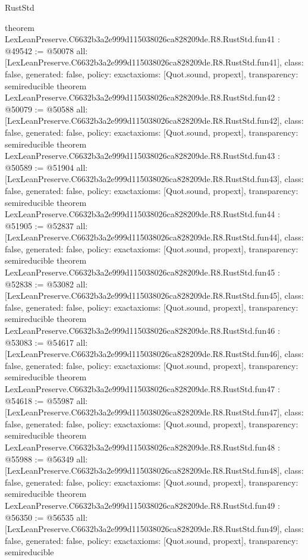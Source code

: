 \begin{lexlean}{RustStd}
\begin{coremodule}
{}
theorem LexLeanPreserve.C6632b3a2e999d115038026ca828209de.R8.RustStd.fun41 : @49542 := @50078 {
  all: [LexLeanPreserve.C6632b3a2e999d115038026ca828209de.R8.RustStd.fun41],
  class: false,
  generated: false,
  policy: exact{axioms: [Quot.sound, propext]},
  transparency: semireducible
}
theorem LexLeanPreserve.C6632b3a2e999d115038026ca828209de.R8.RustStd.fun42 : @50079 := @50588 {
  all: [LexLeanPreserve.C6632b3a2e999d115038026ca828209de.R8.RustStd.fun42],
  class: false,
  generated: false,
  policy: exact{axioms: [Quot.sound, propext]},
  transparency: semireducible
}
theorem LexLeanPreserve.C6632b3a2e999d115038026ca828209de.R8.RustStd.fun43 : @50589 := @51904 {
  all: [LexLeanPreserve.C6632b3a2e999d115038026ca828209de.R8.RustStd.fun43],
  class: false,
  generated: false,
  policy: exact{axioms: [Quot.sound, propext]},
  transparency: semireducible
}
theorem LexLeanPreserve.C6632b3a2e999d115038026ca828209de.R8.RustStd.fun44 : @51905 := @52837 {
  all: [LexLeanPreserve.C6632b3a2e999d115038026ca828209de.R8.RustStd.fun44],
  class: false,
  generated: false,
  policy: exact{axioms: [Quot.sound, propext]},
  transparency: semireducible
}
theorem LexLeanPreserve.C6632b3a2e999d115038026ca828209de.R8.RustStd.fun45 : @52838 := @53082 {
  all: [LexLeanPreserve.C6632b3a2e999d115038026ca828209de.R8.RustStd.fun45],
  class: false,
  generated: false,
  policy: exact{axioms: [Quot.sound, propext]},
  transparency: semireducible
}
theorem LexLeanPreserve.C6632b3a2e999d115038026ca828209de.R8.RustStd.fun46 : @53083 := @54617 {
  all: [LexLeanPreserve.C6632b3a2e999d115038026ca828209de.R8.RustStd.fun46],
  class: false,
  generated: false,
  policy: exact{axioms: [Quot.sound, propext]},
  transparency: semireducible
}
theorem LexLeanPreserve.C6632b3a2e999d115038026ca828209de.R8.RustStd.fun47 : @54618 := @55987 {
  all: [LexLeanPreserve.C6632b3a2e999d115038026ca828209de.R8.RustStd.fun47],
  class: false,
  generated: false,
  policy: exact{axioms: [Quot.sound, propext]},
  transparency: semireducible
}
theorem LexLeanPreserve.C6632b3a2e999d115038026ca828209de.R8.RustStd.fun48 : @55988 := @56349 {
  all: [LexLeanPreserve.C6632b3a2e999d115038026ca828209de.R8.RustStd.fun48],
  class: false,
  generated: false,
  policy: exact{axioms: [Quot.sound, propext]},
  transparency: semireducible
}
theorem LexLeanPreserve.C6632b3a2e999d115038026ca828209de.R8.RustStd.fun49 : @56350 := @56535 {
  all: [LexLeanPreserve.C6632b3a2e999d115038026ca828209de.R8.RustStd.fun49],
  class: false,
  generated: false,
  policy: exact{axioms: [Quot.sound, propext]},
  transparency: semireducible
}
\end{coremodule}
\end{lexlean}
